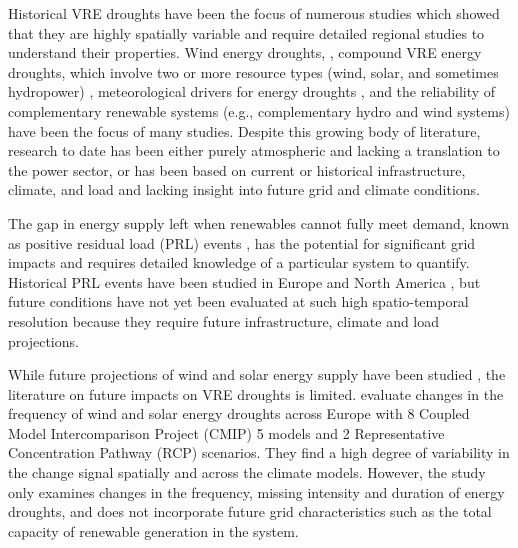 \documentclass{agujournal2019}
\begin{document}

Historical VRE droughts have been the focus of numerous studies which showed that they are highly spatially variable and require detailed regional studies to understand their properties. Wind energy droughts, \cite{Cannon_2015, Potisomporn_2021, Potisomporn_2023, Potisomporn_2024, Abdelaziz_2024, Leahy_2012, Patlakas_2017, Ohlendorf_2020, Kay_2023}, compound VRE energy droughts, which involve two or more resource types (wind, solar, and sometimes hydropower) \cite{Gburcik2013,Otero2022,Bloomfield2020b,Bett2016,Otero2022a,Raynaud2018,Miglietta2017,Bloomfield2020c,Francois2016c,van_der_Wiel_2019a,GonzalezSalazar2022,FerrazdeAndradeSantos2020a,Bloomfield2022,Brown2021,Doering2018,Rinaldi2021,Amonkar2022,Bracken2024,Zheng_2024}, meteorological drivers for energy droughts \cite{Tong2021,Engeland2017a,Mohammadi2018,Lledo2018,van_der_Wiel_2019a,van_der_Wiel_2019b}, and the reliability of complementary renewable systems (e.g., complementary hydro and wind systems) \cite{Jurasz2018,Solomon2016,Potrc2022} have been the focus of many studies. Despite this growing body of literature, research to date has been either purely atmospheric and lacking a translation to the power sector, or has been based on current or historical infrastructure, climate, and load and lacking insight into future grid and climate conditions. 

The gap in energy supply left when renewables cannot fully meet demand, known as positive residual load (PRL) events \cite{Kittel2024}, has the potential for significant grid impacts and requires detailed knowledge of a particular system to quantify. Historical PRL events have been studied in Europe \cite{Raynaud2018, Otero2022, Otero2022a, Fran_ois_2022,Ruhnau_2022, van_der_Wiel_2019a, van_der_Wiel_2019b} and North America \cite{Rinaldi2021, Bracken2024}, but future conditions have not yet been evaluated at such high spatio-temporal resolution because they require future infrastructure, climate and load projections. 

While future projections of wind and solar energy supply have been studied \cite{Jung_2022,Dutta_2022,Gernaat_2021}, the literature on future impacts on VRE droughts is limited.  evaluate changes in the frequency of wind and solar energy droughts across Europe with 8 Coupled Model Intercomparison Project (CMIP) 5 models and 2 Representative Concentration Pathway (RCP) scenarios. They find a high degree of variability in the change signal spatially and across the climate models. However, the study only examines changes in the frequency, missing intensity and duration of energy droughts, and does not incorporate future grid characteristics such as the total capacity of renewable generation in the system. 
\end{document}
